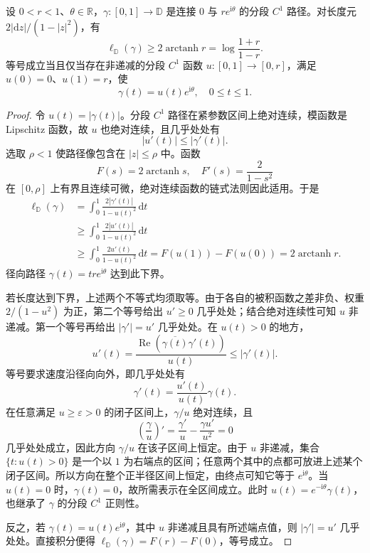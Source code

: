 \begin{lemma}[径向最短路径及其等号条件]\label{b3:lem:13-radial-shortest}
设 \(0<r<1\)、\(\theta\in\mathbb R\)，\(\gamma:[0,1]\to\mathbb D\) 是连接 \(0\) 与 \(re^{\mathrm i\theta}\) 的分段 \(C^1\) 路径。对长度元 \(2|\mathrm dz|/(1-|z|^2)\)，有
\[
 \ell_{\mathbb D}(\gamma)\ge2\operatorname{arctanh}r
 =\log\frac{1+r}{1-r}.
\]
等号成立当且仅当存在非递减的分段 \(C^1\) 函数 \(u:[0,1]\to[0,r]\)，满足 \(u(0)=0\)、\(u(1)=r\)，使
\[
 \gamma(t)=u(t)e^{\mathrm i\theta},
 \quad 0\le t\le1.
\]
\end{lemma}
\begin{proof}
令 \(u(t)=|\gamma(t)|\)。分段 \(C^1\) 路径在紧参数区间上绝对连续，模函数是 Lipschitz 函数，故 \(u\) 也绝对连续，且几乎处处有
\[
 |u'(t)|\le|\gamma'(t)|.
\]
选取 \(\rho<1\) 使路径像包含在 \(|z|\le\rho\) 中。函数
\[
 F(s)=2\operatorname{arctanh}s,
 \quad F'(s)=\frac{2}{1-s^2}
\]
在 \([0,\rho]\) 上有界且连续可微，绝对连续函数的链式法则因此适用。于是
\[
 \begin{aligned}
 \ell_{\mathbb D}(\gamma)
 &=\int_0^1\frac{2|\gamma'(t)|}{1-u(t)^2}\,\mathrm dt\\
 &\ge\int_0^1\frac{2|u'(t)|}{1-u(t)^2}\,\mathrm dt\\
 &\ge\int_0^1\frac{2u'(t)}{1-u(t)^2}\,\mathrm dt
 =F(u(1))-F(u(0))
 =2\operatorname{arctanh}r.
 \end{aligned}
\]
径向路径 \(\gamma(t)=tr e^{\mathrm i\theta}\) 达到此下界。

若长度达到下界，上述两个不等式均须取等。由于各自的被积函数之差非负、权重 \(2/(1-u^2)\) 为正，第二个等号给出 \(u'\ge0\) 几乎处处；结合绝对连续性可知 \(u\) 非递减。第一个等号再给出 \(|\gamma'|=u'\) 几乎处处。在 \(u(t)>0\) 的地方，
\[
 u'(t)
 =\frac{\operatorname{Re}(\overline{\gamma(t)}\gamma'(t))}{u(t)}
 \le|\gamma'(t)|.
\]
等号要求速度沿径向向外，即几乎处处有
\[
 \gamma'(t)=\frac{u'(t)}{u(t)}\gamma(t).
\]
在任意满足 \(u\ge\varepsilon>0\) 的闭子区间上，\(\gamma/u\) 绝对连续，且
\[
 \left(\frac{\gamma}{u}\right)'
 =\frac{\gamma'}{u}-\frac{\gamma u'}{u^2}=0
\]
几乎处处成立，因此方向 \(\gamma/u\) 在该子区间上恒定。由于 \(u\) 非递减，集合 \(\{t:u(t)>0\}\) 是一个以 \(1\) 为右端点的区间；任意两个其中的点都可放进上述某个闭子区间。所以方向在整个正半径区间上恒定，由终点可知它等于 \(e^{\mathrm i\theta}\)。当 \(u(t)=0\) 时，\(\gamma(t)=0\)，故所需表示在全区间成立。此时 \(u(t)=e^{-\mathrm i\theta}\gamma(t)\)，也继承了 \(\gamma\) 的分段 \(C^1\) 正则性。

反之，若 \(\gamma(t)=u(t)e^{\mathrm i\theta}\)，其中 \(u\) 非递减且具有所述端点值，则 \(|\gamma'|=u'\) 几乎处处。直接积分便得 \(\ell_{\mathbb D}(\gamma)=F(r)-F(0)\)，等号成立。
\end{proof}


